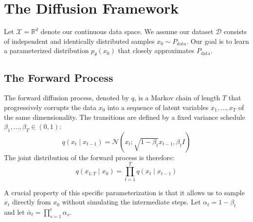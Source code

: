 \section{The Diffusion Framework}

Let $\mathcal{X} = \mathbb{R}^d$ denote our continuous data space. We assume our dataset $\mathcal{D}$ consists of independent and identically distributed samples $x_0 \sim P_{\text{data}}$. Our goal is to learn a parameterized distribution $p_\theta(x_0)$ that closely approximates $P_{\text{data}}$.

\subsection{The Forward Process}

The forward diffusion process, denoted by $q$, is a Markov chain of length $T$ that progressively corrupts the data $x_0$ into a sequence of latent variables $x_1, \dots, x_T$ of the same dimensionality. The transitions are defined by a fixed variance schedule $\beta_1, \dots, \beta_T \in (0, 1)$:
\begin{equation}
    q(x_t \mid x_{t-1}) = \mathcal{N}(x_t; \sqrt{1 - \beta_t} x_{t-1}, \beta_t I)
\end{equation}
The joint distribution of the forward process is therefore:
\begin{equation}
    q(x_{1:T} \mid x_0) = \prod_{t=1}^T q(x_t \mid x_{t-1})
\end{equation}

A crucial property of this specific parameterization is that it allows us to sample $x_t$ directly from $x_0$ without simulating the intermediate steps. Let $\alpha_t = 1 - \beta_t$ and let $\bar{\alpha}_t = \prod_{s=1}^t \alpha_s$. 

